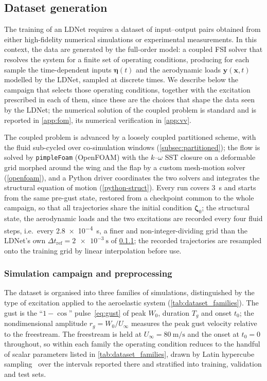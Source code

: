 \subsection{Dataset generation}
\label{subsec:dataset}

The training of an LDNet requires a dataset of input--output pairs obtained from either high-fidelity numerical simulations or experimental measurements. In this context, the data are generated by the full-order model: a coupled FSI solver that resolves the system  for a finite set of operating conditions, producing for each sample the time-dependent inputs $\boldsymbol{\eta}(t)$ and the aerodynamic loads $\mathbf{y}(\mathbf{x},t)$ modelled by the LDNet, sampled at discrete times. We describe below the campaign that selects those operating conditions, together with the excitation prescribed in each of them, since these are the choices that shape the data seen by the LDNet; the numerical solution of the coupled problem is standard and is reported in \cref{app:fom}, its numerical verification in \cref{app:vv}.

The coupled problem is advanced by a loosely coupled partitioned scheme, with the fluid sub-cycled over co-simulation windows (\cref{subsec:partitioned}); the flow is solved by \texttt{pimpleFoam} (OpenFOAM) with the $k$--$\omega$ SST closure on a deformable grid morphed around the wing and the flap by a custom mesh-motion solver (\cref{openfoam}), and a Python driver coordinates the two solvers and integrates the structural equation of motion (\cref{python-struct}). Every run covers \SI{3}{\second} and starts from the same pre-gust state, restored from a checkpoint common to the whole campaign, so that all trajectories share the initial condition $\boldsymbol{\zeta}_0$; the structural state, the aerodynamic loads and the two excitations are recorded every four fluid steps, i.e.\ every \SI{2.8e-4}{\second}, a finer and non-integer-dividing grid than the LDNet's own $\Delta t_{\mathrm{ref}}=\SI{2e-3}{\second}$ of \cref{subsubsec:campaign}; the recorded trajectories are resampled onto the training grid by linear interpolation before use.

\subsubsection{Simulation campaign and preprocessing}
\label{subsubsec:campaign}

The dataset is organised into three families of simulations, distinguished by the type of excitation applied to the aeroelastic system (\cref{tab:dataset_families}). The gust is the ``$1-\cos$'' pulse~\eqref{eq:gust} of peak $W_0$, duration $T_g$ and onset $t_0$; the nondimensional amplitude $r_g = W_0/U_\infty$ measures the peak gust velocity relative to the freestream. The freestream is held at $U_\infty = \SI{80}{\meter\per\second}$ and the onset at $t_0 = 0$ throughout, so within each family the operating condition reduces to the handful of scalar parameters listed in \cref{tab:dataset_families}, drawn by Latin hypercube sampling~\cite{mckay1979lhs} over the intervals reported there and stratified into training, validation and test sets.

